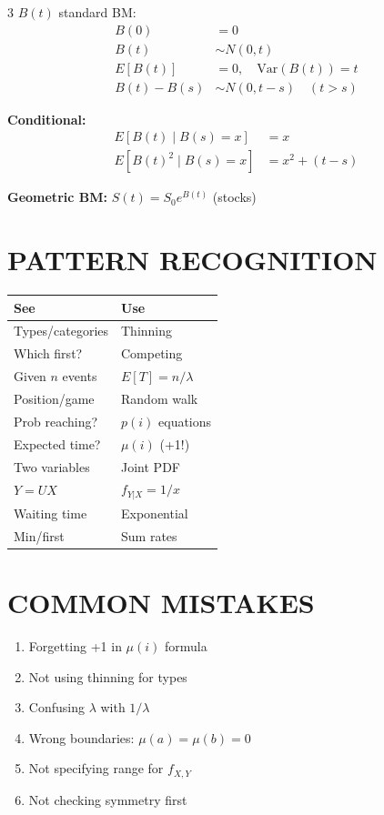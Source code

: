 \documentclass[7pt,landscape]{extarticle}
\begin{document}
\begin{multicols}{3}
$B(t)$ standard BM:
\begin{align*}
B(0) &= 0 \\
B(t) &\sim N(0, t) \\
E[B(t)] &= 0, \quad \text{Var}(B(t)) = t \\
B(t) - B(s) &\sim N(0, t-s) \quad (t > s)
\end{align*}

\textbf{Conditional:}
\begin{align*}
E[B(t) \mid B(s) = x] &= x \\
E[B(t)^2 \mid B(s) = x] &= x^2 + (t-s)
\end{align*}

\textbf{Geometric BM:} $S(t) = S_0 e^{B(t)}$ (stocks)

\section*{PATTERN RECOGNITION}

\begin{tabular}{p{2.5cm}p{2cm}}
\hline
\textbf{See} & \textbf{Use} \\
\hline
Types/categories & Thinning \\
Which first? & Competing \\
Given $n$ events & $E[T]=n/\lambda$ \\
Position/game & Random walk \\
Prob reaching? & $p(i)$ equations \\
Expected time? & $\mu(i)$ (+1!) \\
Two variables & Joint PDF \\
$Y = UX$ & $f_{Y|X}=1/x$ \\
Waiting time & Exponential \\
Min/first & Sum rates \\
\hline
\end{tabular}

\section*{COMMON MISTAKES}

\begin{enumerate}
\item Forgetting +1 in $\mu(i)$ formula
\item Not using thinning for types
\item Confusing $\lambda$ with $1/\lambda$
\item Wrong boundaries: $\mu(a)=\mu(b)=0$
\item Not specifying range for $f_{X,Y}$
\item Not checking symmetry first
\end{enumerate}


\end{multicols}
\end{document}
